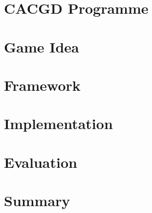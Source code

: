 \documentclass[bibtotocnumbered, headsepline,normalheadings,12pt]{report}
\begin{document}
\chapter{CACGD Programme}
\label{chap:cacgd}

\chapter{Game Idea}
\label{chap:idea}

\chapter{Framework}
\label{chap:framework}

\chapter{Implementation}
\label{chap:impl}

\chapter{Evaluation}
\label{chap:eva}

\chapter{Summary}
\label{chap:sum}

\nocite{*}


\listoffigures
\lstlistoflistings
\begingroup \let\clearpage\relax
\listoftables \endgroup
\end{document}

